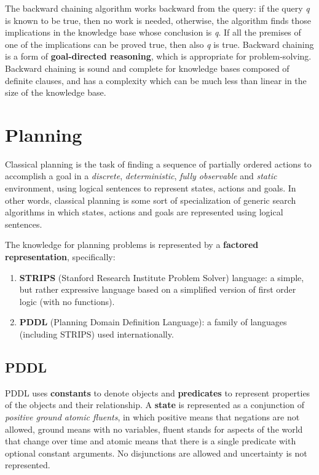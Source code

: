 \documentclass{article}
\begin{document}
The backward chaining algorithm works backward from the query: if the query \textit{q} is known to be true, then no work is needed, otherwise, the algorithm finds those implications in the knowledge base whose conclusion is \textit{q}. If all the premises of one of the implications can be proved true, then also \textit{q} is true. Backward chaining is a form of \textbf{goal-directed reasoning}, which is appropriate for problem-solving. Backward chaining is sound and complete for knowledge bases composed of definite clauses, and has a complexity which can be much less than linear in the size of the knowledge base.

\clearpage
\section{Planning}
Classical planning is the task of finding a sequence of partially ordered actions to accomplish a goal in a \textit{discrete}, \textit{deterministic}, \textit{fully observable} and \textit{static} environment, using logical sentences to represent states, actions and goals. In other words, classical planning is some sort of specialization of generic search algorithms in which states, actions and goals are represented using logical sentences.

The knowledge for planning problems is represented by a \textbf{factored representation}, specifically:
\begin{enumerate}
    \item \textbf{STRIPS} (Stanford Research Institute Problem Solver) language: a simple, but rather expressive language based on a simplified version of first order logic (with no functions).
    \item \textbf{PDDL} (Planning Domain Definition Language): a family of languages (including STRIPS) used internationally.
\end{enumerate}

\subsection{PDDL}
PDDL uses \textbf{constants} to denote objects and \textbf{predicates} to represent properties of the objects and their relationship. A \textbf{state} is represented as a conjunction of \textit{positive ground atomic fluents}, in which positive means that negations are not allowed, ground means with no variables, fluent stands for aspects of the world that change over time and atomic means that there is a single predicate with optional constant arguments. No disjunctions are allowed and uncertainty is not represented.
\end{document}
